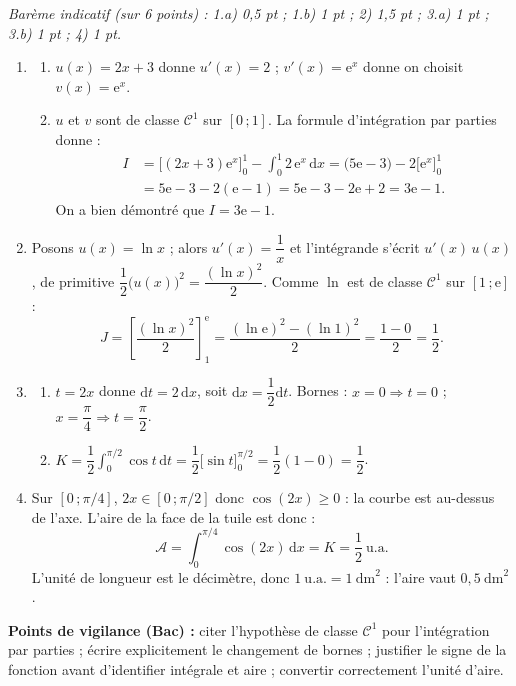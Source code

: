 \documentclass[11pt]{article}
\begin{document}
\begin{corrige}
\emph{Barème indicatif (sur 6 points) : 1.a) 0,5 pt ; 1.b) 1 pt ; 2) 1,5 pt ; 3.a) 1 pt ; 3.b) 1 pt ; 4) 1 pt.}
\begin{enumerate}
\item \begin{enumerate}
\item $u(x)=2x+3$ donne $u'(x)=2$ ; $v'(x)=\mathrm{e}^x$ donne on choisit $v(x)=\mathrm{e}^x$.
\item $u$ et $v$ sont de classe $\mathcal{C}^1$ sur $[0\,;1]$. La formule d'intégration par parties donne :
\begin{align*}
I &= \big[(2x+3)\mathrm{e}^x\big]_0^1 - \int_0^1 2\,\mathrm{e}^x\,\mathrm{d}x = \big(5\mathrm{e} - 3\big) - 2\big[\mathrm{e}^x\big]_0^1\\
&= 5\mathrm{e}-3 - 2(\mathrm{e}-1) = 5\mathrm{e}-3-2\mathrm{e}+2 = 3\mathrm{e}-1.
\end{align*}
On a bien démontré que $I = 3\mathrm{e}-1$.
\end{enumerate}
\item Posons $u(x)=\ln x$ ; alors $u'(x)=\dfrac{1}{x}$ et l'intégrande s'écrit $u'(x)\,u(x)$, de primitive $\dfrac{1}{2}\big(u(x)\big)^2 = \dfrac{(\ln x)^2}{2}$. Comme $\ln$ est de classe $\mathcal{C}^1$ sur $[1\,;\mathrm{e}]$ :
\[
J = \left[\dfrac{(\ln x)^2}{2}\right]_1^{\mathrm{e}} = \dfrac{(\ln\mathrm{e})^2 - (\ln 1)^2}{2} = \dfrac{1-0}{2} = \dfrac{1}{2}.
\]
\item \begin{enumerate}
\item $t=2x$ donne $\mathrm{d}t = 2\,\mathrm{d}x$, soit $\mathrm{d}x = \dfrac{1}{2}\mathrm{d}t$. Bornes : $x=0 \Rightarrow t=0$ ; $x=\dfrac{\pi}{4} \Rightarrow t=\dfrac{\pi}{2}$.
\item $K = \dfrac{1}{2}\displaystyle\int_0^{\pi/2} \cos t\,\mathrm{d}t = \dfrac{1}{2}\big[\sin t\big]_0^{\pi/2} = \dfrac{1}{2}(1-0) = \boxed{\dfrac{1}{2}}$.
\end{enumerate}
\item Sur $[0\,;\pi/4]$, $2x\in[0\,;\pi/2]$ donc $\cos(2x)\ge 0$ : la courbe est au-dessus de l'axe. L'aire de la face de la tuile est donc :
\[
\mathcal{A} = \int_0^{\pi/4} \cos(2x)\,\mathrm{d}x = K = \dfrac{1}{2}\ \text{u.a.}
\]
L'unité de longueur est le décimètre, donc $1\ \text{u.a.} = 1\ \mathrm{dm}^2$ : l'aire vaut $\boxed{0{,}5\ \mathrm{dm}^2}$.
\end{enumerate}
\textbf{Points de vigilance (Bac) :} citer l'hypothèse de classe $\mathcal{C}^1$ pour l'intégration par parties ; écrire explicitement le changement de bornes ; justifier le signe de la fonction avant d'identifier intégrale et aire ; convertir correctement l'unité d'aire.
\end{corrige}
\end{document}
